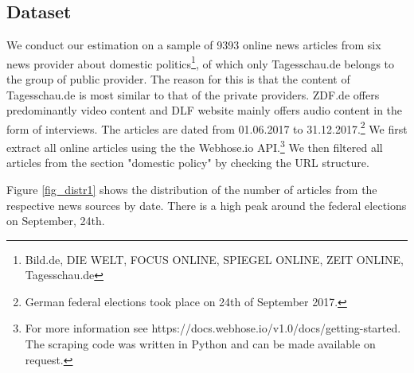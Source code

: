 \documentclass[12pt,a4paper,notitlepage]{article}
\begin{document}
\subsection{Dataset}\label{ch_data}

We conduct our estimation on a sample of 9393 online news articles from six news provider about domestic politics\footnote{Bild.de, DIE WELT, FOCUS ONLINE, SPIEGEL ONLINE, ZEIT ONLINE, Tagesschau.de}, of which only Tagesschau.de belongs to the group of public provider. The reason for this is that the content of Tagesschau.de is most similar to that of the private providers. ZDF.de offers predominantly video content and DLF website mainly offers audio content in the form of interviews. The articles are dated from 01.06.2017 to 31.12.2017.\footnote{German federal elections took place on 24th of September 2017.} We first extract all online articles using the the Webhose.io API.\footnote{For more information see https://docs.webhose.io/v1.0/docs/getting-started. The scraping code was written in Python and can be made available on request.} We then filtered all articles from the section "domestic policy" by checking the URL structure. 

Figure \ref{fig_distr1} shows the distribution of the number of articles from the respective news sources by date. There is a high peak around the federal elections on September, 24th.  

\end{document}
